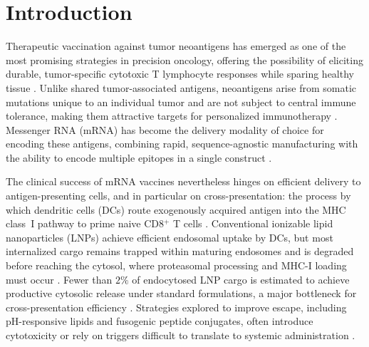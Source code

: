 \section{Introduction}

Therapeutic vaccination against tumor neoantigens has emerged as one of the most promising strategies in precision oncology, offering the possibility of eliciting durable, tumor-specific cytotoxic T lymphocyte responses while sparing healthy tissue \citep{Castillo2024}. Unlike shared tumor-associated antigens, neoantigens arise from somatic mutations unique to an individual tumor and are not subject to central immune tolerance, making them attractive targets for personalized immunotherapy \citep{Reyes2023}. Messenger RNA (mRNA) has become the delivery modality of choice for encoding these antigens, combining rapid, sequence-agnostic manufacturing with the ability to encode multiple epitopes in a single construct \citep{Anand2025}.

The clinical success of mRNA vaccines nevertheless hinges on efficient delivery to antigen-presenting cells, and in particular on cross-presentation: the process by which dendritic cells (DCs) route exogenously acquired antigen into the MHC class~I pathway to prime naive CD8$^{+}$ T cells \citep{Lindgren2022}. Conventional ionizable lipid nanoparticles (LNPs) achieve efficient endosomal uptake by DCs, but most internalized cargo remains trapped within maturing endosomes and is degraded before reaching the cytosol, where proteasomal processing and MHC-I loading must occur \citep{Vertex2021}. Fewer than $2\%$ of endocytosed LNP cargo is estimated to achieve productive cytosolic release under standard formulations, a major bottleneck for cross-presentation efficiency \citep{Nimbus2023}. Strategies explored to improve escape, including pH-responsive lipids and fusogenic peptide conjugates, often introduce cytotoxicity or rely on triggers difficult to translate to systemic administration \citep{Meridian2024}.

